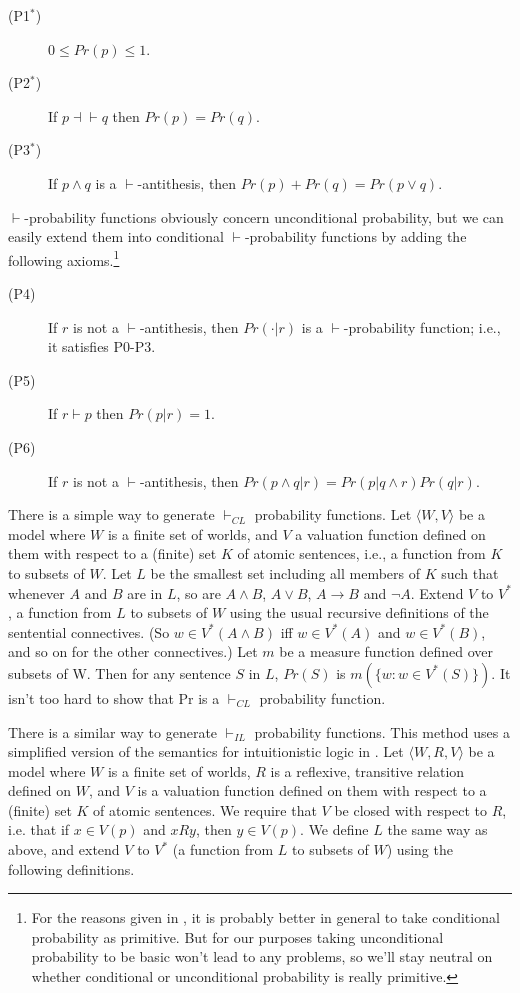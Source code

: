 \begin{description}
\item[(P1$^*$)] $0 \leq Pr(p) \leq 1$.
\item[(P2$^*$)] If $p \dashv \vdash q$ then $Pr(p) = Pr(q)$.
\item[(P3$^*$)] If $p \wedge q$ is a $\vdash$-antithesis, then $Pr(p) + Pr(q) = Pr(p \vee q)$.
\end{description}

\noindent $\vdash$-probability functions obviously concern unconditional probability, but we can easily extend them into conditional $\vdash$-probability functions by adding the following axioms.\footnote{For the reasons given in \citet{Hajek2003}, it is probably better in general to take conditional probability as primitive. But for our purposes taking unconditional probability to be basic won't lead to any problems, so we'll stay neutral on whether conditional or unconditional probability is really primitive.} 

\begin{description}
\item[(P4)] If $r$ is not a $\vdash$-antithesis, then $Pr(\cdot | r)$ is a $\vdash$-probability function; i.e., it satisfies P0-P3.
\item[(P5)] If $r \vdash p$ then $Pr(p | r) = 1$.
\item[(P6)] If $r$ is not a $\vdash$-antithesis, then $Pr(p \wedge q | r) = Pr(p | q \wedge r)Pr(q | r)$.
\end{description}

\noindent There is a simple way to generate $\vdash_{CL}$ probability functions. Let $\langle W, V\rangle$ be a model where $W$ is a finite set of worlds, and $V$ a valuation function defined on them with respect to a (finite) set $K$ of atomic sentences, i.e., a function from $K$ to subsets of $W$. Let $L$ be the smallest set including all members of $K$ such that whenever $A$ and $B$ are in $L$, so are $A \wedge B$, $A \vee B$, $A \rightarrow B$ and $\neg A$. Extend $V$ to $V^*$, a function from $L$ to subsets of $W$ using the usual recursive definitions of the sentential connectives. (So $w \in V^*(A \wedge B)$ iff $w \in V^*(A)$ and $w \in V^*(B)$, and so on for the other connectives.) Let $m$ be a measure function defined over subsets of W. Then for any sentence $S$ in $L$, $Pr(S)$ is $m(\{w: w \in V^*(S)\})$. It isn't too hard to show that Pr is a $\vdash_{CL}$ probability function.

There is a similar way to generate $\vdash_{IL}$ probability functions. This method uses a simplified version of the semantics for intuitionistic logic in \citet{Kripke1965}. Let $\langle W, R, V\rangle$  be a model where $W$ is a finite set of worlds, $R$ is a reflexive, transitive relation defined on $W$, and $V$ is a valuation function defined on them with respect to a (finite) set $K$ of atomic sentences. We require that $V$ be closed with respect to $R$, i.e. that if $x \in V(p)$ and $xRy$, then $y \in V(p)$. We define $L$ the same way as above, and extend $V$ to $V^*$ (a function from $L$ to subsets of $W$) using the following definitions.

